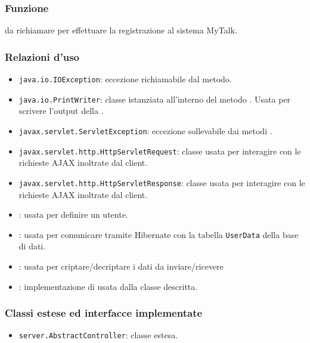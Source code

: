 
\subsubsection*{Funzione}
 da richiamare per effettuare la registrazione al sistema MyTalk.

\subsubsection*{Relazioni d'uso}
\begin{itemize}
	\item \texttt{java.io.IOException}: eccezione richiamabile dal metodo.
	\item \texttt{java.io.PrintWriter}: classe istanziata all'interno del metodo . Usata per scrivere l'output della .
	\item \texttt{javax.servlet.ServletException}: eccezione sollevabile dai metodi .
	\item \texttt{javax.servlet.http.HttpServletRequest}: classe usata per interagire con le richieste AJAX inoltrate dal client.
	\item \texttt{javax.servlet.http.HttpServletResponse}: classe usata per interagire con le richieste AJAX inoltrate dal client.
	\item {}: usata per definire un utente.
	\item {}: usata per comunicare tramite Hibernate con la tabella \texttt{UserData} della base di dati.
	\item {}: usata per criptare/decriptare i dati da inviare/ricevere
	\item {}: implementazione di  usata dalla classe descritta.
	
\end{itemize}

\subsubsection*{Classi estese ed interfacce implementate}
\begin{itemize}
	\item \texttt{server.AbstractController}: classe estesa.
\end{itemize}

